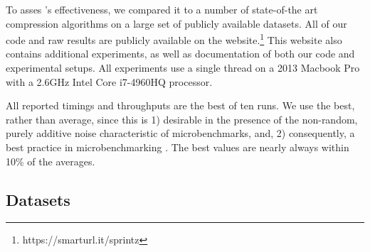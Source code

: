 

To asses \mine's effectiveness, we compared it to a number of state-of-the art compression algorithms on a large set of publicly available datasets. All of our code and raw results are publicly available on the \minesp website.\footnote{https://smarturl.it/sprintz} This website also contains additional experiments, as well as documentation of both our code and experimental setups. All experiments use a single thread on a 2013 Macbook Pro with a 2.6GHz Intel Core i7-4960HQ processor.

All reported timings and throughputs are the best of ten runs. We use the best, rather than average, since this is 1) desirable in the presence of the non-random, purely additive noise characteristic of microbenchmarks, and, 2) consequently, a best practice in microbenchmarking \cite{lemireMicrobenchmarks}. The best values are nearly always within 10\% of the averages.

\subsection{Datasets}

